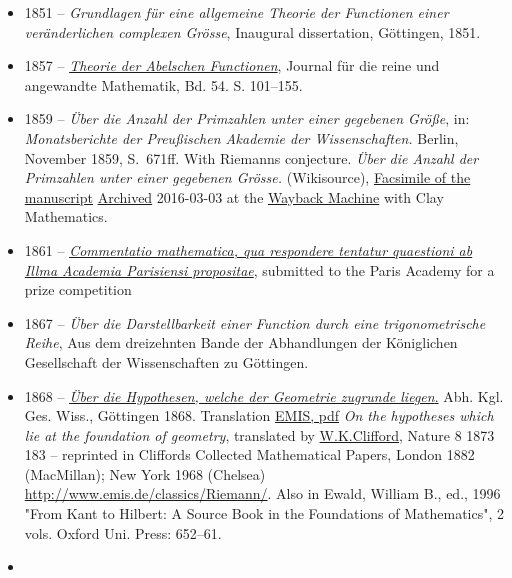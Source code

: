 \begin{itemize}
\tightlist
\item
  {1851 -- \emph{Grundlagen für eine allgemeine Theorie der Functionen einer veränderlichen complexen Grösse}, Inaugural dissertation, Göttingen, 1851.}
\item
  {1857 -- \emph{\href{https://en.wikipedia.org/wiki/List_of_important_publications_in_mathematics\#Theorie_der_Abelschen_Functionen}{Theorie der Abelschen Functionen}}, Journal für die reine und angewandte Mathematik, Bd. 54. S. 101--155.}
\item
  {1859 -- \emph{Über die Anzahl der Primzahlen unter einer gegebenen Größe}, in: \emph{Monatsberichte der Preußischen Akademie der Wissenschaften.} Berlin, November 1859, S.{~}671ff. With Riemann\textquotesingle s conjecture. \emph{Über die Anzahl der Primzahlen unter einer gegebenen Grösse.} (Wikisource), \href{http://www.claymath.org/sites/default/files/riemann1859.pdf}{Facsimile of the manuscript} \href{https://web.archive.org/web/20160303224135/http://www.claymath.org/sites/default/files/riemann1859.pdf}{Archived}{ 2016-03-03 at the }\href{https://en.wikipedia.org/wiki/Wayback_Machine}{Wayback Machine} with Clay Mathematics.}
\item
  {1861 -- \emph{\href{https://www.maths.tcd.ie/pub/HistMath/People/Riemann/Paris/}{Commentatio mathematica, qua respondere tentatur quaestioni ab Illma Academia Parisiensi propositae}}, submitted to the Paris Academy for a prize competition}
\item
  {1867 -- \emph{Über die Darstellbarkeit einer Function durch eine trigonometrische Reihe}, Aus dem dreizehnten Bande der Abhandlungen der Königlichen Gesellschaft der Wissenschaften zu Göttingen.}
\item
  {1868 -- \href{http://resolver.sub.uni-goettingen.de/purl?GDZPPN002019213}{\emph{Über die Hypothesen, welche der Geometrie zugrunde liegen}.} Abh. Kgl. Ges. Wiss., Göttingen 1868. Translation \href{https://www.emis.de/classics/Riemann/WKCGeom.pdf}{EMIS, pdf} \emph{On the hypotheses which lie at the foundation of geometry}, translated by \href{https://en.wikipedia.org/wiki/William_Kingdon_Clifford}{W.K.Clifford}, Nature 8 1873 183 -- reprinted in Clifford\textquotesingle s Collected Mathematical Papers, London 1882 (MacMillan); New York 1968 (Chelsea) \url{http://www.emis.de/classics/Riemann/}. Also in Ewald, William B., ed., 1996 "From Kant to Hilbert: A Source Book in the Foundations of Mathematics", 2 vols. Oxford Uni. Press: 652{--}61.}
\item

\end{itemize}
